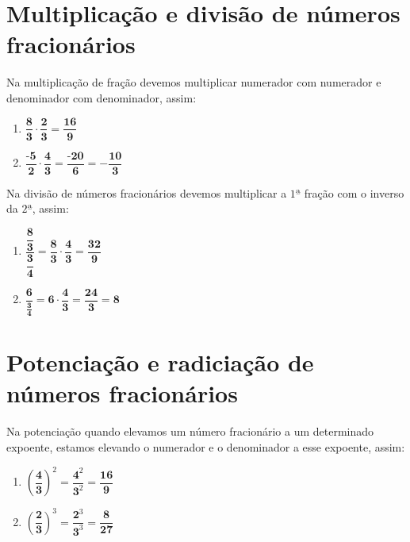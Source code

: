 \section{Multiplicação e divisão de números fracionários}

Na multiplicação de fração devemos multiplicar numerador com numerador e denominador com denominador, assim:
\begin{enumerate}[label=\alph*)]
	\item $\dfrac{\textbf{8}}{\textbf{3}} \cdot \dfrac{\textbf{2}}{\textbf{3}} = \dfrac{\textbf{16}}{\textbf{9}}$
	\item $\dfrac{\textbf{-5}}{\textbf{2}} \cdot \dfrac{\textbf{4}}{\textbf{3}} = \dfrac{\textbf{-20}}{\textbf{6}} = - \dfrac{\textbf{10}}{\textbf{3}}$ \\ 
\end{enumerate}

\noindent Na divisão de números fracionários devemos multiplicar a $1ª$ fração com o inverso da $2ª$, assim:
\begin{enumerate}[label=\alph*)]
	\item $\dfrac{\dfrac{\textbf{8}}{\textbf{3}}}{\dfrac{\textbf{3}}{\textbf{4}}} = \dfrac{\textbf{8}}{\textbf{3}} \cdot \dfrac{\textbf{4}}{\textbf{3}} = \dfrac{\textbf{32}}{\textbf{9}}$
	
	\item $\dfrac{\textbf{6}}{\frac{\textbf{3}}{\textbf{4}}} = \textbf{6} \cdot \dfrac{\textbf{4}}{\textbf{3}} = \dfrac{\textbf{24}}{\textbf{3}} = \textbf{8}$
\end{enumerate}

\section{Potenciação e radiciação de números fracionários}

Na potenciação quando elevamos um número fracionário a um determinado expoente, estamos elevando o numerador e o denominador a esse expoente, assim:
\begin{enumerate}[label=\alph*)]
	\item $\left(\dfrac{\textbf{4}}{\textbf{3}}\right)^{2} = \dfrac{\textbf{4}^{2}}{\textbf{3}^{2}} = \dfrac{\textbf{16}}{\textbf{9}}$
	\item $\left(\dfrac{\textbf{2}}{\textbf{3}}\right)^{3} = \dfrac{\textbf{2}^{3}}{\textbf{3}^{3}} = \dfrac{\textbf{8}}{\textbf{27}}$ \\ 
\end{enumerate}

